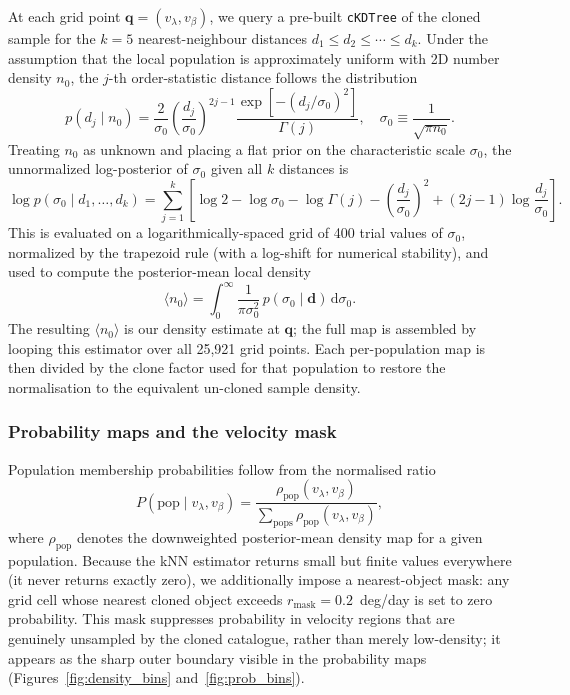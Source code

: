 \documentclass[linenumbers,trackchanges,twocolumn]{aastex701}
\begin{document}
At each grid point $\mathbf{q} = (v_\lambda, v_\beta)$, we query a pre-built \texttt{cKDTree} of the cloned sample for the $k = 5$ nearest-neighbour distances $d_1 \leq d_2 \leq \cdots \leq d_k$.
Under the assumption that the local population is approximately uniform with 2D number density $n_0$, the $j$-th order-statistic distance follows the distribution
\begin{equation}
  p(d_j \mid n_0) = \frac{2}{\sigma_0} \left(\frac{d_j}{\sigma_0}\right)^{2j-1}
  \frac{\exp[-(d_j/\sigma_0)^2]}{\Gamma(j)},
  \quad \sigma_0 \equiv \frac{1}{\sqrt{\pi n_0}}.
\end{equation}
Treating $n_0$ as unknown and placing a flat prior on the characteristic scale $\sigma_0$, the unnormalized log-posterior of $\sigma_0$ given all $k$ distances is
\begin{equation}
  \log p(\sigma_0 \mid d_1,\ldots,d_k)
  = \sum_{j=1}^{k}
    \left[\log 2 - \log \sigma_0 - \log\Gamma(j)
    - \left(\frac{d_j}{\sigma_0}\right)^2
    + (2j-1)\log\frac{d_j}{\sigma_0}\right].
\end{equation}
This is evaluated on a logarithmically-spaced grid of 400 trial values of $\sigma_0$, normalized by the trapezoid rule (with a log-shift for numerical stability), and used to compute the posterior-mean local density
\begin{equation}
  \langle n_0 \rangle = \int_0^\infty \frac{1}{\pi \sigma_0^2}\, p(\sigma_0 \mid \mathbf{d})\, \mathrm{d}\sigma_0.
\end{equation}
The resulting $\langle n_0 \rangle$ is our density estimate at $\mathbf{q}$; the full map is assembled by looping this estimator over all 25,921 grid points.
Each per-population map is then divided by the clone factor used for that population to restore the normalisation to the equivalent un-cloned sample density.

\subsubsection*{Probability maps and the velocity mask}

Population membership probabilities follow from the normalised ratio
\begin{equation}
  P(\mathrm{pop} \mid v_\lambda, v_\beta)
  = \frac{\rho_{\mathrm{pop}}(v_\lambda, v_\beta)}
         {\displaystyle\sum_{\mathrm{pops}} \rho_{\mathrm{pop}}(v_\lambda, v_\beta)},
\end{equation}
where $\rho_{\mathrm{pop}}$ denotes the downweighted posterior-mean density map for a given population.
Because the kNN estimator returns small but finite values everywhere (it never returns exactly zero), we additionally impose a nearest-object mask: any grid cell whose nearest cloned object exceeds $r_\mathrm{mask} = 0.2$~deg/day is set to zero probability.
This mask suppresses probability in velocity regions that are genuinely unsampled by the cloned catalogue, rather than merely low-density; it appears as the sharp outer boundary visible in the probability maps (Figures~\ref{fig:density_bins} and~\ref{fig:prob_bins}).
\end{document}
